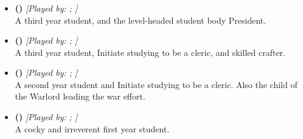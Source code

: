 \documentclass[blue]{GL2020}
\begin{document}
\subsubsection*{\pShip{}}
\begin{itemize}
    \item \textbf{\cPresident{\full} (\cPresident{\MYcharpronouns})} \textit{[Played by: \cPresident{\MYplayer}; \cPresident{\MYplayerpronouns}]}\\ A third year student, and the level-headed student body President.

    \item \textbf{\cInitiate{\full} (\cInitiate{\MYcharpronouns})} \textit{[Played by: \cInitiate{\MYplayer}; \cInitiate{\MYplayerpronouns}]}\\ A third year student, Initiate studying to be a cleric, and skilled crafter.
   	 
    \item \textbf{\cWarlordDaughter{\full} (\cWarlordDaughter{\MYcharpronouns})} \textit{[Played by: \cWarlordDaughter{\MYplayer}; \cWarlordDaughter{\MYplayerpronouns}]}\\ A second year student and Initiate studying to be a cleric. Also the child of the Warlord leading the \pShip{} war effort.
   		 
    \item \textbf{\cPirateChild{\full} (\cPirateChild{\MYcharpronouns})} \textit{[Played by: \cPirateChild{\MYplayer}; \cPirateChild{\MYplayerpronouns}]}\\ A cocky and irreverent first year student.
   	 
\end{itemize}
\end{document}
